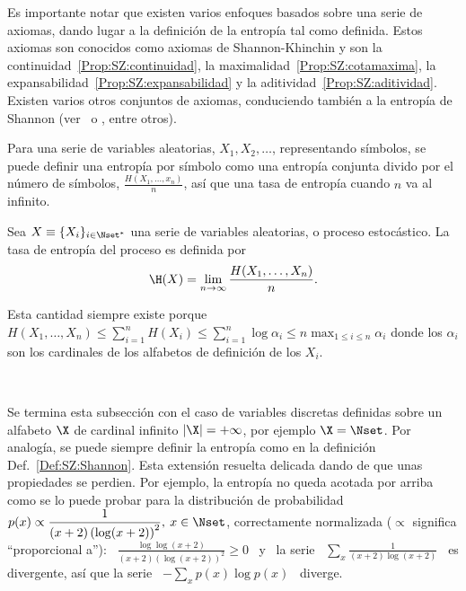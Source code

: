 Es  importante notar  que existen  varios enfoques  basados sobre  una  serie de
axiomas, dando lugar a la definici\'on de la entrop\'ia tal como definida. Estos
axiomas   son   conocidos   como   axiomas   de  Shannon-Khinchin   y   son   la
continuidad~\ref{Prop:SZ:continuidad},  la maximalidad~\ref{Prop:SZ:cotamaxima},
la           expansabilidad~\ref{Prop:SZ:expansabilidad}           y          la
aditividad~\ref{Prop:SZ:aditividad}.  Existen varios otros conjuntos de axiomas,
conduciendo  tambi\'en a  la entrop\'ia  de Shannon  (ver~\cite[Sec.~6]{Sha48} o
\cite{ShaWea64, Fad56, Fad58, Khi57, Ren61}, entre otros).

Para  una  serie de  variables  aleatorias,  $X_1,  X_2, \ldots$,  representando
s\'imbolos, se  puede definir una  entrop\'ia por s\'imbolo como  una entrop\'ia
conjunta  divido por el  n\'umero de  s\'imbolos, $\frac{H(X_1,\ldots,x_n)}{n}$,
as\'i que una tasa de entrop\'ia cuando $n$ va al infinito.
%
\begin{definicion}\label{Def:SZ:TasaDeEntropia}
  Sea $X \equiv \{ X_i \}_{i  \in \Nset^*}$ una serie de variables aleatorias, o
  proceso estoc\'astico.  La tasa de entrop\'ia del proceso es definida por
  \[
  \H(X) = \lim_{n \to \infty} \frac{H(X_1,\ldots,X_n)}{n}.
  \]
\end{definicion}
%
\noindent Esta  cantidad siempre existe  porque $\displaystyle H(X_1 ,  \ldots ,
X_n) \le \sum_{i=1}^n H(X_i) \le \sum_{i=1}^n  \log \alpha_i \le n \max_{1 \le i
  \le n} \alpha_i$  donde los $\alpha_i$ son los cardinales  de los alfabetos de
definici\'on de los $X_i$.

\

Se termina esta subsecci\'on con el caso de variables discretas definidas sobre
un  alfabeto $\X$ de  cardinal infinito  $|\X| =  + \infty$,  por ejemplo  $\X =
\Nset$.   Por analog\'ia,  se puede  siempre definir  la entrop\'ia  como  en la
definici\'on Def.~\ref{Def:SZ:Shannon}. Esta extensi\'on resuelta delicada dando
de que unas propiedades se perdien.  Por ejemplo, la entrop\'ia no queda acotada
por arriba  como se  lo puede  probar para la  distribuci\'on de  probabilidad \
$\displaystyle p(x)  \propto \frac{1}{(x+2) \left(  \log (x+2) \right)^2},  \: x
\in \Nset$, correctamente  normalizada ($\propto$ significa ``proporcional a''):
\ $\displaystyle \frac{\log \log(x+2)}{(x+2) \left( \log (x+2) \right)^2} \ge 0$
\  y  \ la  serie  \  $\displaystyle \sum_x  \frac{1}{(x+2)  \log  (x+2)}$ \  es
divergente,  as\'i que  la serie  \ $\displaystyle  - \sum_x  p(x) \log  p(x)$ \
diverge.

